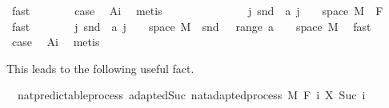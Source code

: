 \begin{isabellebody}
\ fast\isanewline
\ \ \ \ \isamarkupfalse%
\ \isamarkupfalse%
\ {\isacharquery}{\kern0pt}case\ \isamarkupfalse%
\ A{\isacharunderscore}{\kern0pt}i\ \isamarkupfalse%
\ metis\isanewline
\ \ \isamarkupfalse%
\isanewline
\ \ \ \ \isamarkupfalse%
\ {}\isanewline
\ \ \ \ \isamarkupfalse%
\ {\isachardoublequoteopen}{\isacharparenleft}{\kern0pt}{\isasymUnion}j{\isachardot}{\kern0pt}\ snd\ {\isacharbackquote}{\kern0pt}\ {\isacharparenleft}{\kern0pt}a\ j\ {\isasyminter}\ {\isacharparenleft}{\kern0pt}{\isacharbraceleft}{\kern0pt}{}{\isacharbraceright}{\kern0pt}\ {\isasymtimes}\ space\ M{\isacharparenright}{\kern0pt}{\isacharparenright}{\kern0pt}{\isacharparenright}{\kern0pt}\ {\isasymin}\ F\ {}{\isachardoublequoteclose}\ \isamarkupfalse%
\ {\isacharasterisk}{\kern0pt}\ \isamarkupfalse%
\ fast\isanewline
\ \ \ \ \isamarkupfalse%
\ \isamarkupfalse%
\ {\isachardoublequoteopen}{\isacharparenleft}{\kern0pt}{\isasymUnion}j{\isachardot}{\kern0pt}\ snd\ {\isacharbackquote}{\kern0pt}\ {\isacharparenleft}{\kern0pt}a\ j\ {\isasyminter}\ {\isacharparenleft}{\kern0pt}{\isacharbraceleft}{\kern0pt}{}{\isacharbraceright}{\kern0pt}\ {\isasymtimes}\ space\ M{\isacharparenright}{\kern0pt}{\isacharparenright}{\kern0pt}{\isacharparenright}{\kern0pt}\ {\isacharequal}{\kern0pt}\ snd\ {\isacharbackquote}{\kern0pt}\ {\isacharparenleft}{\kern0pt}{\isasymUnion}\ {\isacharparenleft}{\kern0pt}range\ a{\isacharparenright}{\kern0pt}\ {\isasyminter}\ {\isacharparenleft}{\kern0pt}{\isacharbraceleft}{\kern0pt}{}{\isacharbraceright}{\kern0pt}\ {\isasymtimes}\ space\ M{\isacharparenright}{\kern0pt}{\isacharparenright}{\kern0pt}{\isachardoublequoteclose}\ \isamarkupfalse%
\ fast\isanewline
\ \ \ \ \isamarkupfalse%
\ \isamarkupfalse%
\ {\isacharquery}{\kern0pt}case\ \isamarkupfalse%
\ A{\isacharunderscore}{\kern0pt}i\ \isamarkupfalse%
\ metis\isanewline
\ \ \isacommand{{\isacharbraceright}{\kern0pt}}\isamarkupfalse%
\isanewline
{}\isamarkupfalse%
%
\endisatagproof
{\isafoldproof}%
%
\isadelimproof
%
\endisadelimproof
%
\begin{isamarkuptext}%
This leads to the following useful fact.%
\end{isamarkuptext}\isamarkuptrue%
\isamarkupfalse%
\ {\isacharparenleft}{\kern0pt}\ nat{\isacharunderscore}{\kern0pt}predictable{\isacharunderscore}{\kern0pt}process{\isacharparenright}{\kern0pt}\ adapted{\isacharunderscore}{\kern0pt}Suc{\isacharcolon}{\kern0pt}\ {\isachardoublequoteopen}nat{\isacharunderscore}{\kern0pt}adapted{\isacharunderscore}{\kern0pt}process\ M\ F\ {\isacharparenleft}{\kern0pt}{\isasymlambda}i{\isachardot}{\kern0pt}\ X\ {\isacharparenleft}{\kern0pt}Suc\ i{\isacharparenright}{\kern0pt}{\isacharparenright}{\kern0pt}{\isachardoublequoteclose}\isanewline

\end{isabellebody}
